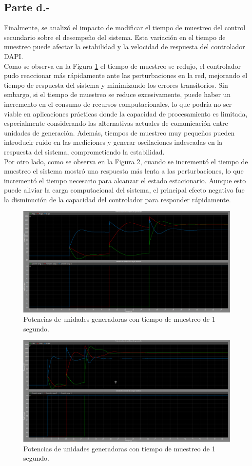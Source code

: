 \subsection{Parte d.-}

Finalmente, se analizó el impacto de modificar el tiempo de muestreo del control secundario sobre el desempeño del sistema. Esta variación en el tiempo de muestreo puede afectar la estabilidad y la velocidad de respuesta del controlador DAPI.\\

Como se observa en la Figura \ref{sampling_bajo} el tiempo de muestreo se redujo, el controlador pudo reaccionar más rápidamente ante las perturbaciones en la red, mejorando el tiempo de respuesta del sistema y minimizando los errores transitorios. Sin embargo, si el tiempo de muestreo se reduce excesivamente, puede haber un incremento en el consumo de recursos computacionales, lo que podría no ser viable en aplicaciones prácticas donde la capacidad de procesamiento es limitada, especialmente considerando las alternativas actuales de comunicación entre unidades de generación. Además, tiempos de muestreo muy pequeños pueden introducir ruido en las mediciones y generar oscilaciones indeseadas en la respuesta del sistema, comprometiendo la estabilidad.\\

Por otro lado, como se observa en la Figura \ref{sampling_alto}, cuando se incrementó el tiempo de muestreo el sistema mostró una respuesta más lenta a las perturbaciones, lo que incrementó el tiempo necesario para alcanzar el estado estacionario. Aunque esto puede aliviar la carga computacional del sistema, el principal efecto negativo fue la disminución de la capacidad del controlador para responder rápidamente.

\begin{figure}
    \centering
    \includegraphics[width=0.5\linewidth]{Tarea 2/report/imagenes/p2b/sampling_bajo.png}
    \caption{Potencias de unidades generadoras con tiempo de muestreo de 1 segundo.}
    \label{sampling_bajo}
\end{figure}

\begin{figure}
    \centering
    \includegraphics[width=0.5\linewidth]{Tarea 2/report/imagenes/p2b/sampling_alto.png}
    \caption{Potencias de unidades generadoras con tiempo de muestreo de 1 segundo.}
    \label{sampling_alto}
\end{figure}

